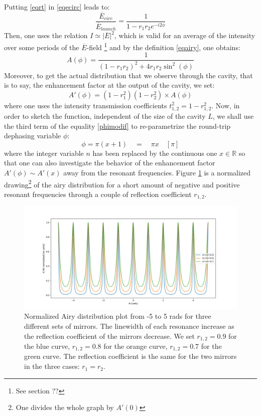 \documentclass[11pt]{report}
\begin{document}
Putting \eqref{eqrt} in \eqref{eqecirc} leads to:
\begin{equation}
\frac{\overline{E}_{circ}}{\overline{E}_{launch}} = \frac{1}{1 - r_1 r_2 e^{-i2\phi}}
\end{equation}
Then, one uses the relation $ I \simeq \vert\overline{E}\vert^2$, which is valid for an average of the intensity over some periods of the $\overline{E}$-field \footnote{See section ??} and by the definition \eqref{eqairy}, one obtains:
\begin{equation}
\label{airyformula}
A(\phi) = \frac{1}{(1 - r_1 r_2)^2 + 4 r_1 r_2 \sin^2(\phi)}
\end{equation}
Moreover, to get the actual distribution that we observe through the cavity, that is to say, the enhancement factor at the output of the cavity, we set:
\begin{equation}
\label{airyformulasec}
A'(\phi) = (1-r_1^2)(1-r_2^2)\times A(\phi)
\end{equation}
where one uses the intensity transmission coefficients $t_{1,2}^2 = 1-r_{1,2}^2$. Now, in order to sketch the function, independent of the size of the cavity $L$, we shall use the third term of the equality \eqref{phimodif} to re-parametrize the round-trip dephasing variable $\phi$:
\begin{equation}
\label{phidef}
\phi = \pi(x+1) \quad = \quad \pi x \quad [\pi]
\end{equation}
where the integer variable $n$ has been replaced by the continuous one $x \in \mathbb{R}$ so that one can also investigate the behavior of the enhancement factor $A'(\phi) \sim A'(x)$ away from the resonant frequencies. Figure \ref{fig:airy-dist} is a normalized drawing\footnote{One divides the whole graph by $A'(0)$} of the airy distribution for a short amount of negative and positive resonant frequencies through a couple of reflection coefficient $r_{1,2}$. 

\begin{figure}[h]
\centering
\includegraphics[width=\textwidth]{airy-dist}
\caption{Normalized Airy distribution plot from -5 to 5 rads for three different sets of mirrors. The linewidth of each resonance increase as the reflection coefficient of the mirrors decrease. We set $r_{1,2} = 0.9$ for the blue curve, $r_{1,2} = 0.8$ for the orange curve, $r_{1,2} = 0.7$ for the green curve. The reflection coefficient is the same for the two mirrors in the three cases: $r_{1} = r_{2}$.}
\label{fig:airy-dist}
\end{figure}
\end{document}
